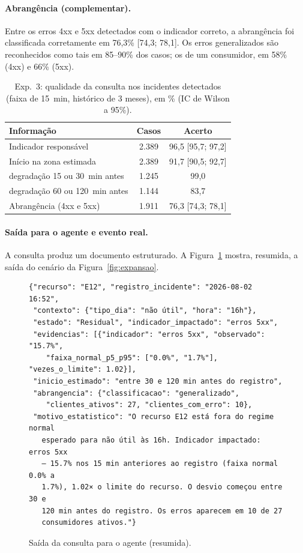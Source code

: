 \documentclass[sigconf,nonacm]{acmart}
\begin{document}
\paragraph{Abrangência (complementar).} Entre os erros 4xx e 5xx detectados com o indicador correto, a abrangência foi classificada corretamente em 76,3\% [74,3; 78,1]. Os erros generalizados são reconhecidos como tais em 85--90\% dos casos; os de um consumidor, em 58\% (4xx) e 66\% (5xx).

\begin{table}[t]
  \caption{Exp.~3: qualidade da consulta nos incidentes detectados (faixa de 15~min, histórico de 3 meses), em \% (IC de Wilson a 95\%).}
  \label{tab:consulta}
  \small
  \begin{tabular}{lcc}
    \toprule
    Informação & Casos & Acerto \\
    \midrule
    Indicador responsável & 2.389 & 96,5 [95,7; 97,2] \\
    Início na zona estimada & 2.389 & 91,7 [90,5; 92,7] \\
    \quad degradação 15 ou 30~min antes & 1.245 & 99,0 \\
    \quad degradação 60 ou 120~min antes & 1.144 & 83,7 \\
    Abrangência (4xx e 5xx) & 1.911 & 76,3 [74,3; 78,1] \\
    \bottomrule
  \end{tabular}
\end{table}

\paragraph{Saída para o agente e evento real.} A consulta produz um documento estruturado. A Figura~\ref{fig:json} mostra, resumida, a saída do cenário da Figura~\ref{fig:expansao}.

\begin{figure}[t]
\begin{Verbatim}[fontsize=\scriptsize,frame=single]
{"recurso": "E12", "registro_incidente": "2026-08-02 16:52",
 "contexto": {"tipo_dia": "não útil", "hora": "16h"},
 "estado": "Residual", "indicador_impactado": "erros 5xx",
 "evidencias": [{"indicador": "erros 5xx", "observado": "15.7%",
    "faixa_normal_p5_p95": ["0.0%", "1.7%"], "vezes_o_limite": 1.02}],
 "inicio_estimado": "entre 30 e 120 min antes do registro",
 "abrangencia": {"classificacao": "generalizado",
    "clientes_ativos": 27, "clientes_com_erro": 10},
 "motivo_estatistico": "O recurso E12 está fora do regime normal
   esperado para não útil às 16h. Indicador impactado: erros 5xx
   — 15.7% nos 15 min anteriores ao registro (faixa normal 0.0% a
   1.7%), 1.02× o limite do recurso. O desvio começou entre 30 e
   120 min antes do registro. Os erros aparecem em 10 de 27
   consumidores ativos."}
\end{Verbatim}
\caption{Saída da consulta para o agente (resumida).}
\label{fig:json}
\end{figure}
\end{document}

